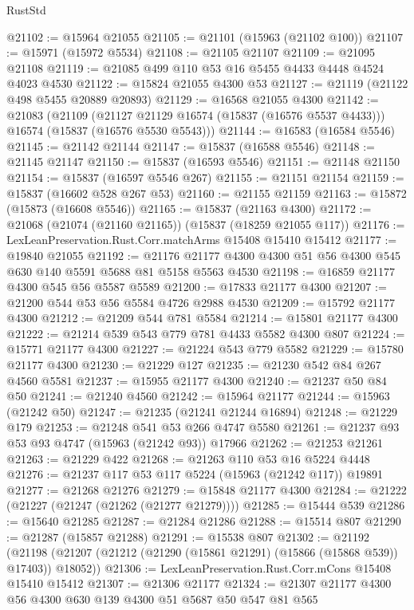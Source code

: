 \begin{lexlean}{RustStd}
\begin{coremodule}
{\begin{coremodule}
{{{{{{{{{{{{{{{{{{{{{{{{{{{{{{{{{{{{{{{{{{{{{{{{{{{{{{{{{{{{@21102 := @15964 @21055
@21105 := @21101 (@15963 (@21102 @100))
@21107 := @15971 (@15972 @5534)
@21108 := @21105 @21107
@21109 := @21095 @21108
@21119 := @21085 @499 @110 @53 @16 @5455 @4433 @4448 @4524 @4023 @4530
@21122 := @15824 @21055 @4300 @53
@21127 := @21119 (@21122 @498 @5455 @20889 @20893)
@21129 := @16568 @21055 @4300
@21142 := @21083
    (@21109
      (@21127 @21129 @16574 (@15837 (@16576 @5537 @4433)))
      @16574
      (@15837 (@16576 @5530 @5543)))
@21144 := @16583 (@16584 @5546)
@21145 := @21142 @21144
@21147 := @15837 (@16588 @5546)
@21148 := @21145 @21147
@21150 := @15837 (@16593 @5546)
@21151 := @21148 @21150
@21154 := @15837 (@16597 @5546 @267)
@21155 := @21151 @21154
@21159 := @15837 (@16602 @528 @267 @53)
@21160 := @21155 @21159
@21163 := @15872 (@15873 (@16608 @5546))
@21165 := @15837 (@21163 @4300)
@21172 := @21068 (@21074 (@21160 @21165)) (@15837 (@18259 @21055 @117))
@21176 := LexLeanPreservation.Rust.Corr.matchArms @15408 @15410 @15412
@21177 := @19840 @21055
@21192 := @21176 @21177 @4300 @4300 @51 @56 @4300 @545 @630 @140 @5591 @5688 @81 @5158 @5563 @4530
@21198 := @16859 @21177 @4300 @545 @56 @5587 @5589
@21200 := @17833 @21177 @4300
@21207 := @21200 @544 @53 @56 @5584 @4726 @2988 @4530
@21209 := @15792 @21177 @4300
@21212 := @21209 @544 @781 @5584
@21214 := @15801 @21177 @4300
@21222 := @21214 @539 @543 @779 @781 @4433 @5582 @4300 @807
@21224 := @15771 @21177 @4300
@21227 := @21224 @543 @779 @5582
@21229 := @15780 @21177 @4300
@21230 := @21229 @127
@21235 := @21230 @542 @84 @267 @4560 @5581
@21237 := @15955 @21177 @4300
@21240 := @21237 @50 @84 @50
@21241 := @21240 @4560
@21242 := @15964 @21177
@21244 := @15963 (@21242 @50)
@21247 := @21235 (@21241 @21244 @16894)
@21248 := @21229 @179
@21253 := @21248 @541 @53 @266 @4747 @5580
@21261 := @21237 @93 @53 @93 @4747 (@15963 (@21242 @93)) @17966
@21262 := @21253 @21261
@21263 := @21229 @422
@21268 := @21263 @110 @53 @16 @5224 @4448
@21276 := @21237 @117 @53 @117 @5224 (@15963 (@21242 @117)) @19891
@21277 := @21268 @21276
@21279 := @15848 @21177 @4300
@21284 := @21222 (@21227 (@21247 (@21262 (@21277 @21279))))
@21285 := @15444 @539
@21286 := @15640 @21285
@21287 := @21284 @21286
@21288 := @15514 @807
@21290 := @21287 (@15857 @21288)
@21291 := @15538 @807
@21302 := @21192
    (@21198 (@21207 (@21212 (@21290 (@15861 @21291) (@15866 (@15868 @539)) @17403)) @18052))
@21306 := LexLeanPreservation.Rust.Corr.mCons @15408 @15410 @15412
@21307 := @21306 @21177
@21324 := @21307
    @21177
    @4300
    @56
    @4300
    @630
    @139
    @4300
    @51
    @5687
    @50
    @547
    @81
    @565
}}}}}}}}}}}}}}}}}}}}}}}}}}}}}}}}}}}}}}}}}}}}}}}}}}}}}}}}}}}}
\end{coremodule}}
\end{coremodule}
\end{lexlean}
